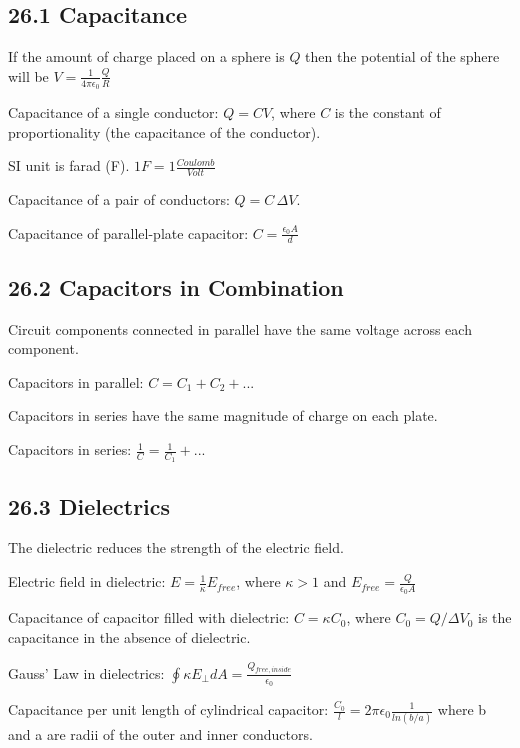 \documentclass[twocolumn]{article}
\newenvironment{small_item}{
\begin{itemize}
  \setlength{\itemsep}{.25pt}
  \setlength{\parskip}{0pt}
  \setlength{\parsep}{0pt}
}{\end{itemize}}
\begin{document}
	\subsection*{26.1 Capacitance} %
	\label{sub:26_1_capacitance}
	
	\begin{small_item}
		\item If the amount of charge placed on a sphere is $Q$ then the potential of the sphere will be $V = \frac{1}{4\pi\epsilon_0}\frac{Q}{R}$
		\item Capacitance of a single conductor: $Q = CV$, where $C$ is the constant of proportionality (the capacitance of the conductor). 
		\item SI unit is farad (F).  $1F = 1\frac{Coulomb}{Volt}$
		\item Capacitance of a pair of conductors: $Q = C\,\Delta V$.
		\item Capacitance of parallel-plate capacitor: $C = \frac{\epsilon_0A}{d}$
	\end{small_item}
	
	\subsection*{26.2 Capacitors in Combination} %
	\label{sub:26_2_capacitors_in_combination}
	
	\begin{small_item}
		\item Circuit components connected in parallel have the same voltage across each component.
		\item Capacitors in parallel: $C = C_1 + C_2 + ...$
		\item Capacitors in series have the same magnitude of charge on each plate.
		\item Capacitors in series: $\frac{1}{C} = \frac{1}{C_1} + ...$
	\end{small_item}
	
	\subsection*{26.3 Dielectrics} %
	\label{sub:26_3_dielectrics}
	
	\begin{small_item}
		\item The dielectric reduces the strength of the electric field.
		\item Electric field in dielectric: $E = \frac{1}{\kappa}E_{free}$, where $\kappa > 1$ and $E_{free} = \frac{Q}{\epsilon_0A}$
		\item Capacitance of capacitor filled with dielectric: $C = \kappa C_0$, where $C_0 = Q/\Delta V_0$ is the capacitance in the absence of dielectric.
		\item Gauss' Law in dielectrics: $\oint \kappa E_{\perp} dA = \frac{Q_{free, inside}}{\epsilon_0}$
		\item Capacitance per unit length of cylindrical capacitor: $\frac{C_0}{l} = 2\pi\epsilon_0 \frac{1}{ln(b/a)}$ where b and a are radii of the outer and inner conductors.
	\end{small_item}
	
\end{document}
